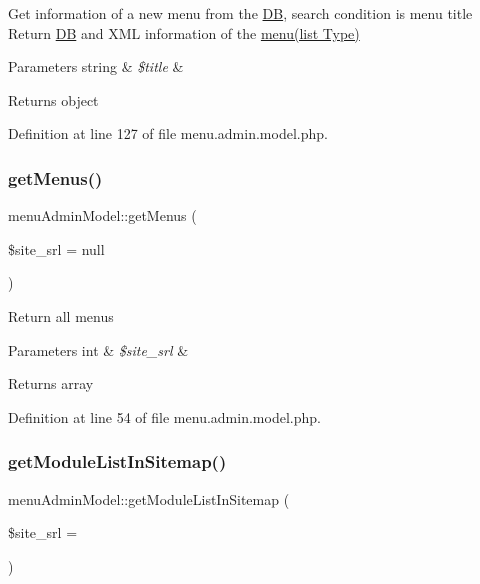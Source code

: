 Get information of a new menu from the \hyperlink{classDB}{DB}, search condition is menu title Return \hyperlink{classDB}{DB} and X\+ML information of the \hyperlink{classmenu}{menu(list Type)} 
\begin{DoxyParams}[1]{Parameters}
string & {\em \$title} & \\
\hline
\end{DoxyParams}
\begin{DoxyReturn}{Returns}
object 
\end{DoxyReturn}


Definition at line 127 of file menu.\+admin.\+model.\+php.

\hypertarget{classmenuAdminModel_a78dfe866b68c04fd622df4d41bdce36c}{}\label{classmenuAdminModel_a78dfe866b68c04fd622df4d41bdce36c} 
\subsubsection{\texorpdfstring{get\+Menus()}{getMenus()}}
{\footnotesize\ttfamily menu\+Admin\+Model\+::get\+Menus (\begin{DoxyParamCaption}\item[{}]{\$site\+\_\+srl = {\ttfamily null} }\end{DoxyParamCaption})}

Return all menus 
\begin{DoxyParams}[1]{Parameters}
int & {\em \$site\+\_\+srl} & \\
\hline
\end{DoxyParams}
\begin{DoxyReturn}{Returns}
array 
\end{DoxyReturn}


Definition at line 54 of file menu.\+admin.\+model.\+php.

\hypertarget{classmenuAdminModel_a20137764f7bc81d8413f7adc0518d895}{}\label{classmenuAdminModel_a20137764f7bc81d8413f7adc0518d895} 
\subsubsection{\texorpdfstring{get\+Module\+List\+In\+Sitemap()}{getModuleListInSitemap()}}
{\footnotesize\ttfamily menu\+Admin\+Model\+::get\+Module\+List\+In\+Sitemap (\begin{DoxyParamCaption}\item[{}]{\$site\+\_\+srl = {} }\end{DoxyParamCaption})}




